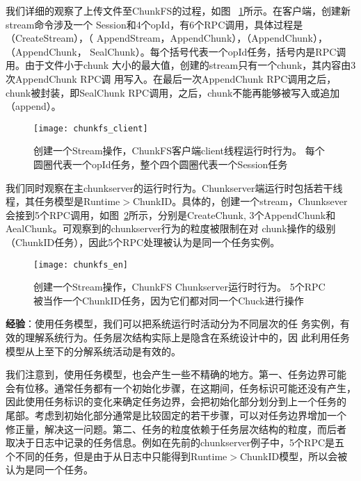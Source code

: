 我们详细的观察了上传文件至ChunkFS的过程，如图~
\ref{fig:chunkfs_client}所示。在客户端，创建新stream命令涉及一个
Session和4个opId，有6个RPC调用，具体过程是（Create\-Stream），（
Append\-Stream，Append\-Chunk），（Append\-Chunk），（Append\-Chunk，
Seal\-Chunk）。每个括号代表一个opId任务，括号内是RPC调用。由于文件小于chunk
大小的最大值，创建的stream只有一个chunk，其内容由3次Append\-Chunk RPC调
用写入。在最后一次Append\-Chunk RPC调用之后，chunk被封装，即Seal\-Chunk
RPC调用，之后，chunk不能再能够被写入或追加（append）。

\begin{figure}
  \centering
  \begin{minipage}{0.8\linewidth}
    \centering
    \texttt{[image: chunkfs\_client]}
    \caption{创建一个Stream操作，ChunkFS客户端client线程运行时行为。
    每个圆圈代表一个opId任务，整个四个圆圈代表一个Session任务}
    \label{fig:chunkfs_client}
  \end{minipage}
\end{figure}


我们同时观察在主chunkserver的运行时行为。Chunkserver端运行时包括若干线
程，其任务模型是Runtime$>$ChunkID。具体的，创建一个stream，Chunksever
会接到5个RPC调用，如图~\ref{fig:chunkserver}所示，分别是Create\-Chunk,
3个Append\-Chunk和Aeal\-Chunk。可观察到的chunkserver行为的粒度被限制在对
chunk操作的级别（ChunkID任务），因此5个RPC处理被认为是同一个任务实例。

\begin{figure}
  \centering
  \begin{minipage}{0.8\linewidth}
    \centering
    \texttt{[image: chunkfs\_en]}
    \caption{创建一个Stream操作，ChunkFS Chunkserver运行时行为。
    5个RPC被当作一个ChunkID任务，因为它们都对同一个Chuck进行操作}
    \label{fig:chunkserver}
  \end{minipage}
\end{figure}



\textbf{经验}：使用任务模型，我们可以把系统运行时活动分为不同层次的任
务实例，有效的理解系统行为。任务层次结构实际上是隐含在系统设计中的，因
此利用任务模型从上至下的分解系统活动是有效的。

我们注意到，使用任务模型，也会产生一些不精确的地方。第一、任务边界可能
会有位移。通常任务都有一个初始化步骤，在这期间，任务标识可能还没有产生，
因此使用任务标识的变化来确定任务边界，会把初始化部分划分到上一个任务的
尾部。考虑到初始化部分通常是比较固定的若干步骤，可以对任务边界增加一个
修正量，解决这一问题。第二、任务的粒度依赖于任务层次结构的粒度，而后者
取决于日志中记录的任务信息。例如在先前的chunkserver例子中，5个RPC是五
个不同的任务，但是由于从日志中只能得到Runtime$>$ChunkID模型，所以会被
认为是同一个任务。

